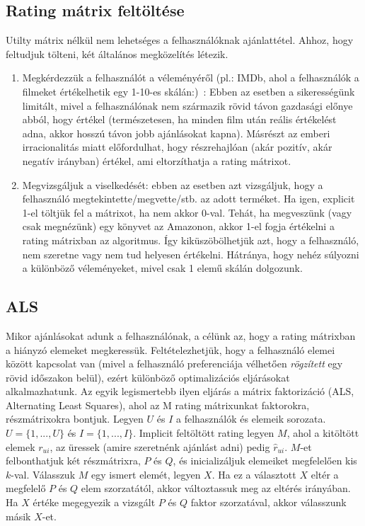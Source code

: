 \documentclass[a4paper,12pt]{article}
\begin{document}
\subsection{Rating mátrix feltöltése}
Utilty mátrix nélkül nem lehetséges a felhasználóknak ajánlattétel. Ahhoz, hogy feltudjuk tölteni, két általános megközelítés létezik.
\begin{enumerate}
\item Megkérdezzük a felhasználót a véleményéről (pl.: IMDb, ahol a felhasználók a filmeket értékelhetik egy 1-10-es skálán:)~\cite{imdb}: Ebben az esetben a sikerességünk limitált, mivel a felhasználónak nem származik rövid távon gazdasági előnye abból, hogy értékel (természetesen, ha minden film után reális értékelést adna, akkor hosszú távon jobb ajánlásokat kapna). Másrészt az emberi irracionalitás miatt előfordulhat, hogy részrehajlóan (akár pozitív, akár negatív irányban) értékel, ami eltorzíthatja a rating mátrixot. ~\cite{introspection}
\item Megvizsgáljuk a viselkedését: ebben az esetben azt vizsgáljuk, hogy a felhasználó megtekintette/megvette/stb. az adott terméket. Ha igen, explicit 1-el töltjük fel a mátrixot, ha nem akkor 0-val. Tehát, ha megveszünk (vagy csak megnézünk) egy könyvet az Amazonon, akkor 1-el fogja értékelni a rating mátrixban az algoritmus. Így kiküszöbölhetjük azt, hogy a felhasználó, nem szeretne vagy nem tud helyesen értékelni. Hátránya, hogy nehéz súlyozni a különböző véleményeket, mivel csak 1 elemű skálán dolgozunk.
\end{enumerate}

\subsection{ALS}
Mikor ajánlásokat adunk a felhasználónak, a célünk az, hogy a rating mátrixban a hiányzó elemeket megkeressük. Feltételezhetjük, hogy a felhasználó elemei között kapcsolat van (mivel a felhasználó preferenciája vélhetően \textsl{rögzített} egy rövid időszakon belül), ezért különböző optimalizációs eljárásokat alkalmazhatunk. Az egyik legismertebb ilyen eljárás a mátrix faktorizáció (ALS, Alternating Least Squares), ahol az M rating mátrixunkat faktorokra, részmátrixokra bontjuk. \linebreak
Legyen $U$ és $I$ a felhasználók és elemeik sorozata. $U={\{1, ..., U\}}$ és $I={\{1, ..., I\}}$.  Implicit feltöltött rating legyen $M$, ahol a kitöltött elemek 
$r_{ui}$, az üressek (amire szeretnénk ajánlást adni) pedig $\hat{r}_{ui}$. $M$-et felbonthatjuk két részmátrixra, $P$ és $Q$, és inicializáljuk elemeiket megfelelően kis $k$-val. Válasszuk $M$ egy ismert elemét, legyen $X$. Ha ez a választott $X$ eltér a megfelelő $P$ és $Q$ elem szorzatától, akkor változtassuk meg az eltérés irányában. Ha $X$ értéke megegyezik a vizsgált $P$ és $Q$ faktor szorzatával, akkor válasszunk másik $X$-et.
\end{document}
